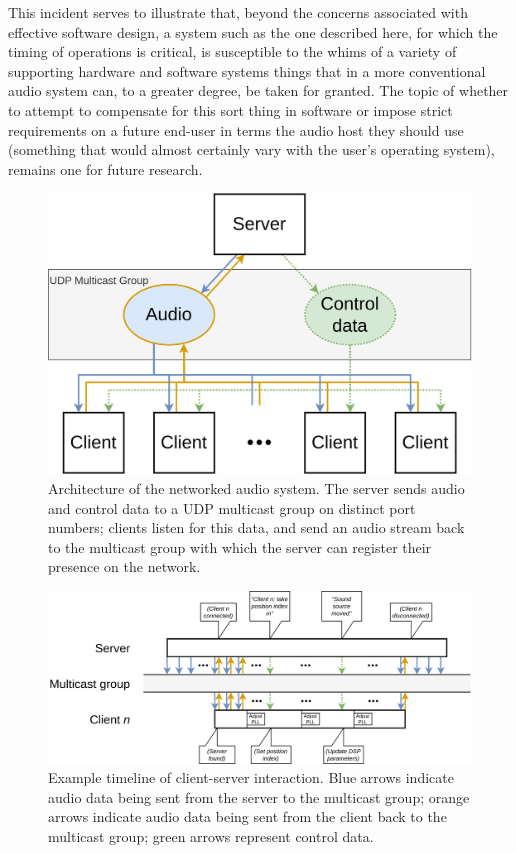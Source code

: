 This incident serves to illustrate that, beyond the concerns associated
with effective software design, a system such as the one described here, for
which the timing of operations is critical, is susceptible to the whims of
a variety of supporting hardware and software systems \textemdash{} things
that in a more conventional audio system can, to a greater degree, be taken for
granted.
The topic of whether to attempt to compensate for this sort thing in software
or impose strict requirements on a future end-user in terms the audio host they
should use (something that would almost certainly vary with the user's
operating system), remains one for future research.

\begin{figure}[ht]
    \centering
    \includegraphics[width=.75\textwidth]{figures/multicast}
    \caption{Architecture of the networked audio system.
    The server sends audio and control data to a UDP multicast group on
    distinct port numbers; clients listen for this data, and send an audio
    stream back to the multicast group with which the server can register
    their presence on the network.}
    \label{fig:multicast}
\end{figure}

\begin{figure}[ht]
    \centering
    \includegraphics[width=\textwidth]{figures/timeline}
    \caption{Example timeline of client-server interaction. Blue arrows
    indicate audio data being sent from the server to the multicast group;
    orange arrows indicate audio data being sent from the client back to the
    multicast group;
    green arrows represent control data.}
    \label{fig:timeline}
\end{figure}

